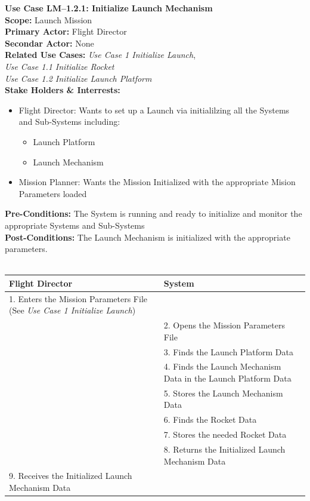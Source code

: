 \documentclass[letterpaper]{article}
\begin{document}
\noindent
\textbf{Use Case LM--1.2.1:  Initialize Launch Mechanism}\\
\textbf{Scope:  }Launch Mission\\
\textbf{Primary Actor:  }Flight Director\\
\textbf{Secondar Actor:  }None\\
\textbf{Related Use Cases:  }\textit{Use Case 1 Initialize Launch},\\
\textit{Use Case 1.1 Initialize Rocket}\\
\textit{Use Case 1.2 Initialize Launch Platform}\\
\textbf{Stake Holders \& Interrests:}
\begin{itemize}
\item Flight Director:  Wants to set up a Launch via initialilzing
all the Systems and Sub-Systems including:
\begin{itemize}
\item Launch Platform
\item Launch Mechanism
\end{itemize}
\item Mission Planner: Wants the Mission Initialized with the
appropriate Mision Parameters loaded
\end{itemize}
\textbf{Pre-Conditions:  }The System is running and ready to
initialize and monitor the appropriate Systems and Sub-Systems\\
\textbf{Post-Conditions: }The Launch Mechanism is initialized with the
appropriate parameters.\\\\
\begin{tabular}{|p{5.75cm}|p{5.75cm}|}\hline
\textbf{Flight Director}&\textbf{System}\\\hline
1. Enters the Mission Parameters File (See \textit{Use Case 1
Initialize Launch})&\\\hline
&2. Opens the Mission Parameters File\\\hline
&3. Finds the Launch Platform Data\\\hline
&4. Finds the Launch Mechanism Data in the Launch Platform
Data\\\hline
&5. Stores the Launch Mechanism Data\\\hline
&6. Finds the Rocket Data\\\hline
&7. Stores the needed Rocket Data\\\hline
&8. Returns the Initialized Launch Mechanism Data\\\hline
9. Receives the Initialized Launch Mechanism Data&\\\hline
\end{tabular}\\\\
\end{document}
